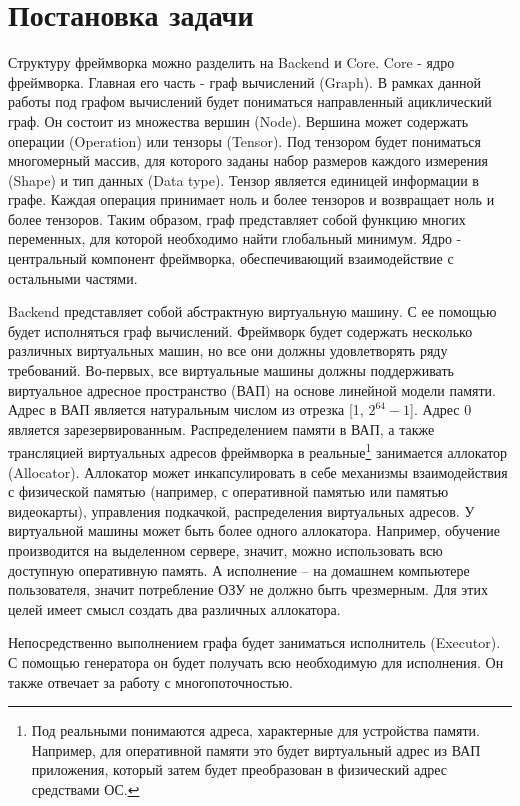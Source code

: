 \clearpage
\section{Постановка задачи}
Структуру фреймворка можно разделить на Backend и Core. Core - ядро фреймворка. Главная его часть - граф вычислений (Graph). В рамках данной работы под графом вычислений будет пониматься направленный ациклический граф. Он состоит из множества вершин (Node). Вершина может содержать операции (Operation) или тензоры (Tensor). Под тензором будет пониматься многомерный массив, для которого заданы набор размеров каждого измерения (Shape) и тип данных (Data type). Тензор является единицей информации в графе. Каждая операция принимает ноль и более тензоров и возвращает ноль и более тензоров. Таким образом, граф представляет собой функцию многих переменных, для которой необходимо найти глобальный минимум. Ядро - центральный компонент фреймворка, обеспечивающий взаимодействие с остальными частями.
\par
Backend представляет собой абстрактную виртуальную машину. С ее помощью будет исполняться граф вычислений. Фреймворк будет содержать несколько различных виртуальных машин, но все они должны удовлетворять ряду требований. Во-первых, все виртуальные машины должны поддерживать виртуальное адресное пространство (ВАП) на основе линейной модели памяти. Адрес в ВАП является натуральным числом из отрезка [1, $2^{64}-1$]. Адрес 0 является зарезервированным. Распределением памяти в ВАП, а также трансляцией виртуальных адресов фреймворка в реальные\footnote{Под реальными понимаются адреса, характерные для устройства памяти. Например, для оперативной памяти это будет виртуальный адрес из ВАП приложения, который затем будет преобразован в физический адрес средствами ОС.} занимается аллокатор (Allocator). Аллокатор может инкапсулировать в себе механизмы взаимодействия с физической памятью (например, с оперативной памятью или памятью видеокарты), управления подкачкой, распределения виртуальных адресов. У виртуальной машины может быть более одного аллокатора. Например, обучение производится на выделенном сервере, значит, можно использовать всю доступную оперативную память. А исполнение -- на домашнем компьютере пользователя, значит потребление ОЗУ не должно быть чрезмерным. Для этих целей имеет смысл создать два различных аллокатора.
\par
Непосредственно выполнением графа будет заниматься исполнитель (Executor). С помощью генератора он будет получать всю необходимую для исполнения. Он также отвечает за работу с многопоточностью.
